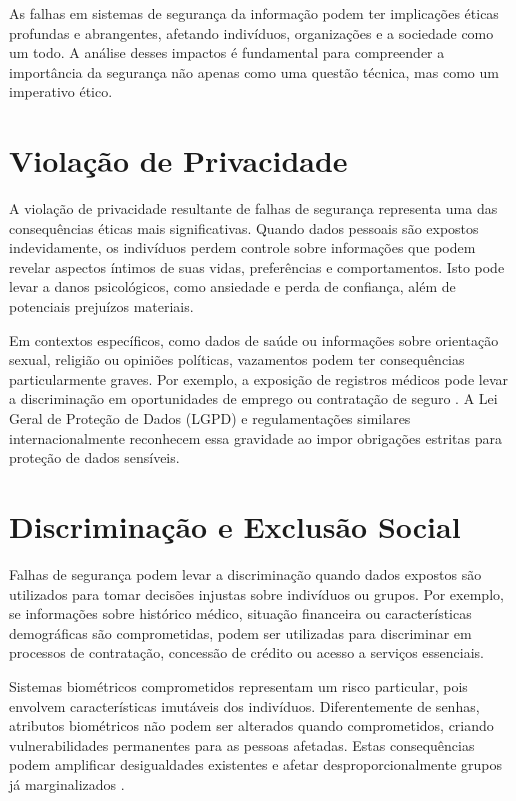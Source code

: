 As falhas em sistemas de segurança da informação podem ter implicações éticas profundas e abrangentes, afetando indivíduos, organizações e a sociedade como um todo. A análise desses impactos é fundamental para compreender a importância da segurança não apenas como uma questão técnica, mas como um imperativo ético.

\section{Violação de Privacidade}

A violação de privacidade resultante de falhas de segurança representa uma das consequências éticas mais significativas. Quando dados pessoais são expostos indevidamente, os indivíduos perdem controle sobre informações que podem revelar aspectos íntimos de suas vidas, preferências e comportamentos. Isto pode levar a danos psicológicos, como ansiedade e perda de confiança, além de potenciais prejuízos materiais.

Em contextos específicos, como dados de saúde ou informações sobre orientação sexual, religião ou opiniões políticas, vazamentos podem ter consequências particularmente graves. Por exemplo, a exposição de registros médicos pode levar a discriminação em oportunidades de emprego ou contratação de seguro \cite{bishop2018computer}. A Lei Geral de Proteção de Dados (LGPD) e regulamentações similares internacionalmente reconhecem essa gravidade ao impor obrigações estritas para proteção de dados sensíveis.

\section{Discriminação e Exclusão Social}

Falhas de segurança podem levar a discriminação quando dados expostos são utilizados para tomar decisões injustas sobre indivíduos ou grupos. Por exemplo, se informações sobre histórico médico, situação financeira ou características demográficas são comprometidas, podem ser utilizadas para discriminar em processos de contratação, concessão de crédito ou acesso a serviços essenciais.

Sistemas biométricos comprometidos representam um risco particular, pois envolvem características imutáveis dos indivíduos. Diferentemente de senhas, atributos biométricos não podem ser alterados quando comprometidos, criando vulnerabilidades permanentes para as pessoas afetadas. Estas consequências podem amplificar desigualdades existentes e afetar desproporcionalmente grupos já marginalizados \cite{spinello2013cyberethics}.


